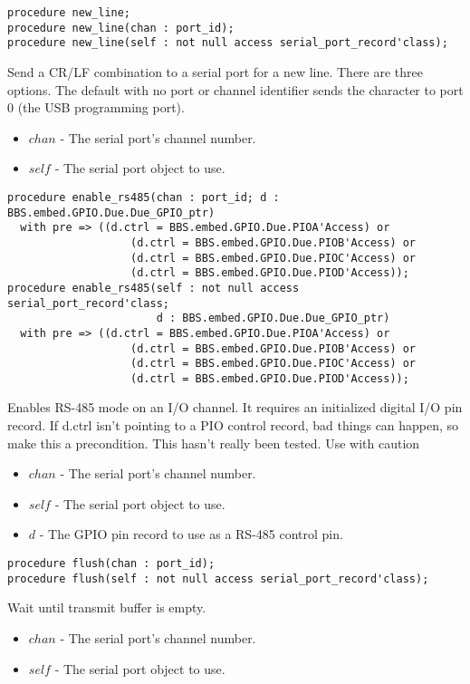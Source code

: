 \documentclass[10pt, openany]{book}
\newcommand{\indexfunc}[1]{\index[func]{#1}}
\begin{document}
\begin{lstlisting}
procedure new_line;
procedure new_line(chan : port_id);
procedure new_line(self : not null access serial_port_record'class);
\end{lstlisting}
\indexfunc{new\_line}
Send a CR/LF combination to a serial port for a new line.  There are three options.  The default with no port or channel identifier sends the character to port 0 (the USB programming port).
\begin{itemize}
  \item $chan$ - The serial port's channel number.
  \item $self$ - The serial port object to use.
\end{itemize}

\begin{lstlisting}
procedure enable_rs485(chan : port_id; d : BBS.embed.GPIO.Due.Due_GPIO_ptr)
  with pre => ((d.ctrl = BBS.embed.GPIO.Due.PIOA'Access) or
                   (d.ctrl = BBS.embed.GPIO.Due.PIOB'Access) or
                   (d.ctrl = BBS.embed.GPIO.Due.PIOC'Access) or
                   (d.ctrl = BBS.embed.GPIO.Due.PIOD'Access));
procedure enable_rs485(self : not null access serial_port_record'class;
                       d : BBS.embed.GPIO.Due.Due_GPIO_ptr)
  with pre => ((d.ctrl = BBS.embed.GPIO.Due.PIOA'Access) or
                   (d.ctrl = BBS.embed.GPIO.Due.PIOB'Access) or
                   (d.ctrl = BBS.embed.GPIO.Due.PIOC'Access) or
                   (d.ctrl = BBS.embed.GPIO.Due.PIOD'Access));
\end{lstlisting}
\indexfunc{enable\_rs485}
Enables RS-485 mode on an I/O channel.  It requires an initialized digital I/O pin record.  If d.ctrl isn't pointing to a PIO control record, bad things can happen, so make this a precondition.  This hasn't really been tested.  Use with caution
\begin{itemize}
  \item $chan$ - The serial port's channel number.
  \item $self$ - The serial port object to use.
  \item $d$ - The GPIO pin record to use as a RS-485 control pin.
\end{itemize}

\begin{lstlisting}
procedure flush(chan : port_id);
procedure flush(self : not null access serial_port_record'class);
\end{lstlisting}
\indexfunc{flush}
Wait until transmit buffer is empty.
\begin{itemize}
  \item $chan$ - The serial port's channel number.
  \item $self$ - The serial port object to use.
\end{itemize}
\end{document}
